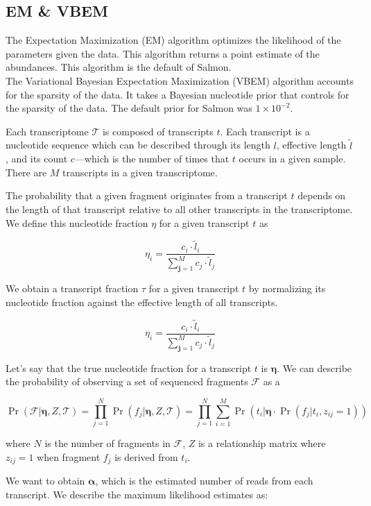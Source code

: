 \subsection{EM \& VBEM}

The Expectation Maximization (EM) algorithm optimizes the likelihood of the parameters given the data. This algorithm returns a point estimate of the abundances. 
This algorithm is  the default of Salmon.
\\
The Variational Bayesian Expectation Maximization (VBEM) algorithm accounts for the sparsity of the data. It takes a Bayesian nucleotide prior that controls for the sparsity of the data. The default prior for Salmon was $1 \times 10 ^{-2}$.

Each transcriptome \(\mathcal{T}\) is composed of transcripts \(t\).
Each transcript is a nucleotide sequence which can be described through
its length \(l\), effective length \(\tilde l\), and its count
\(c\)---which is the number of times that \(t\) occurs in a given
sample. There are \(M\) transcripts in a given transcriptome.

The probability that a given fragment originates from a transcript \(t\)
depends on the length of that transcript relative to all other
transcripts in the transcriptome. We define this nucleotide fraction
\(\eta\) for a given transcript \(t\) as

\[\eta_i= \dfrac{c_i \cdot \tilde l _i}{\sum^{M}_{\pmb{j} = 1}c_j \cdot \tilde l _j}\]

We obtain a transcript fraction \(\tau\) for a given transcript \(t\) by
normalizing its nucleotide fraction against the effective length of all
transcripts.

\[\eta_i= \dfrac{c_i \cdot \tilde l _i}{\sum^{M}_{\pmb{j} = 1}c_j \cdot \tilde l _j}\]

Let's say that the true nucleotide fraction for a transcript \(t\) is
\(\pmb{\eta}\). We can describe the probability of observing a set of
sequenced fragments \(\mathcal{F}\) as a

\[\Pr\left( \mathcal{F}| \pmb{\eta}, Z, \mathcal{T} \right) = \prod^{N}_{j=1} \Pr\left( f_j| \pmb{\eta}, Z, \mathcal{T} \right) = \prod^{N}_{j=1}\sum^{M}_{i=1} \Pr\left( t_i| \pmb{\eta} \cdot \Pr\left( f_j|t_i,z _{ij} =1 \right)  \right)\]

where \(N\) is the number of fragments in \(\mathcal{F}\), \(Z\) is a
relationship matrix where \(z _{ij} =1\) when fragment \(f_j\) is
derived from \(t_i\).

We want to obtain \(\pmb{\alpha}\), which is the estimated number of
reads from each transcript. We describe the maximum likelihood estimates
as:

